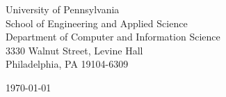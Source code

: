 \begin{minipage}{0.49\textwidth}
\begin{flushleft}
\noindent
University of Pennsylvania\\
School of Engineering and Applied Science\\
Department of Computer and Information Science\\
3330 Walnut Street, Levine Hall\\
Philadelphia, PA 19104-6309
\end{flushleft}
\end{minipage}
\begin{minipage}{0.47\textwidth}
\begin{flushright}
\today
\end{flushright}
\end{minipage} \\

\newcommand{\univ}{University of Pennsylvania}
\newcommand{\univshort}{UPenn}
\newcommand{\degree}{M.Sc.}
\newcommand{\dept}{Computer and Information Science}

